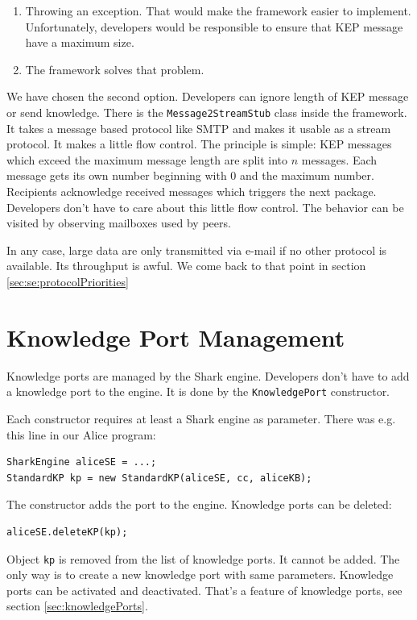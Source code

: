 \begin{enumerate}
    \item Throwing an exception. That would make the framework easier to implement. Unfortunately, developers would be responsible to ensure that KEP message have a maximum size.
\item The framework solves that problem. 
\end{enumerate}

We have chosen the second option. Developers can ignore length of KEP message or send knowledge. There is the {\tt Message2StreamStub} class inside the framework. It takes a message based protocol like SMTP and makes it usable as a stream protocol. It makes a little flow control. The principle is simple: KEP messages which exceed the maximum message length are split into $n$ messages. Each message gets its own number beginning with 0 and the maximum number. Recipients acknowledge received messages which triggers the next package. Developers don't have to care about this little flow control. The behavior can be visited by observing mailboxes used by peers.

In any case, large data are only transmitted via e-mail if no other protocol is available. Its throughput is awful. We come back to that point in section \ref{sec:se:protocolPriorities}

\section{Knowledge Port Management}
Knowledge ports are managed by the Shark engine. Developers don't have to add a knowledge port to the engine. It is done by the {\tt KnowledgePort} constructor.

Each constructor requires at least a Shark engine as parameter. There was e.g. this line in our Alice program:

\begin{verbatim}
SharkEngine aliceSE = ...;
StandardKP kp = new StandardKP(aliceSE, cc, aliceKB);
\end{verbatim}   

The constructor adds the port to the engine. Knowledge ports can be deleted:

\begin{verbatim}
aliceSE.deleteKP(kp);
\end{verbatim}

Object {\tt kp} is removed from the list of knowledge ports. It cannot be added. The only way is to create a new knowledge port with same parameters. Knowledge ports can be activated and deactivated. That's a feature of knowledge ports, see section \ref{sec:knowledgePorts}.

